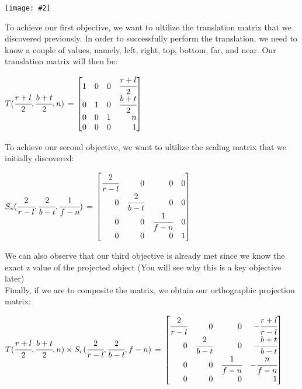 \documentclass[11pt]{article}
\newcommand{\image}[2]{\texttt{[image: \#2]}}
\newcommand{\mat}[1]{
    $\begin{bmatrix*}[r]
        #1
    \end{bmatrix*}$
} %
\newcommand{\gap}{\vspace*{0.5cm}}
\begin{document}
\begin{center}
    \image{0.6}{orthographic_projection}{}
\end{center}
To achieve our first objective, we want to ultilize the translation matrix that we discovered previously. In order to successfully perform the translation, we need to know a couple of values, namely, left, right, top, bottom, far, and near. Our translation matrix will then be:
\begin{center}
    $T(\cfrac{r+l}{2},\cfrac{b+t}{2},n)$ = \mat{
        1 & 0 & 0 & \cfrac{r+l}{2}\\
        0 & 1 & 0 & \cfrac{b+t}{2}\\
        0 & 0 & 1 & n\\
        0 & 0 & 0 & 1 \\
    }
\end{center}
To achieve our second objective, we want to ultilize the scaling matrix that we initially discovered: 
\begin{center}
    $S_v(\cfrac{2}{r-l}, \cfrac{2}{b-t}, \cfrac{1}{f-n})$ = \mat{
    \cfrac{2}{r-l} & 0 & 0 & 0 \\
    0 & \cfrac{2}{b-t} & 0 & 0 \\
    0 & 0 & \cfrac{1}{f-n} & 0 \\
    0 & 0 & 0 & 1
}
\end{center}
We can also observe that our third objective is already met since we know the exact z value of the projected object (You will see why this is a key objective later) \gap \\
Finally, if we are to composite the matrix, we obtain our orthographic projection matrix:
\begin{center}
    $T(\cfrac{r+l}{2},\cfrac{b+t}{2},n) \times S_v(\cfrac{2}{r-l}, \cfrac{2}{b-t}, f-n)$ = \mat{
        \cfrac{2}{r-l} & 0 & 0 & -\cfrac{r+l}{r-l}\\
        0 & \cfrac{2}{b-t} & 0 & -\cfrac{b+t}{b-t}\\
        0 & 0 & \cfrac{1}{f-n} & -\cfrac{n}{f-n} \\
        0 & 0 & 0 & 1
    }
\end{center}
\end{document}
